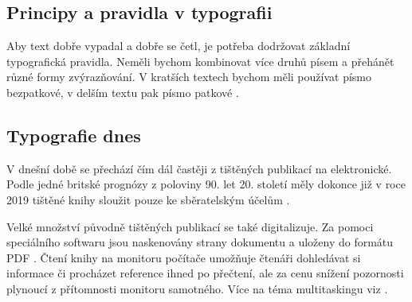 \documentclass[a4paper, 11pt]{article}
\begin{document}
\subsection{Principy a pravidla v typografii}
Aby text dobře vypadal a dobře se četl, je potřeba dodržovat základní typografická pravidla. Neměli bychom kombinovat více druhů písem a přehánět různé formy zvýrazňování. V kratších textech bychom měli používat písmo bezpatkové, v delším textu pak písmo patkové \cite{Tejkalova2014}.

\subsection{Typografie dnes}
V dnešní době se přechází čím dál častěji z tištěných publikací na elektronické. Podle jedné britské prognózy z poloviny 90. let 20. století měly dokonce již v roce 2019 tištěné knihy sloužit pouze ke sběratelským účelům \cite{Cisar2006}. 

Velké množství původně tištěných publikací se také digitalizuje. Za pomoci speciálního softwaru jsou naskenovány strany dokumentu a uloženy do formátu PDF \cite{Stern2009}.
Čtení knihy na monitoru počítače umožňuje čtenáři dohledávat si informace či procházet reference ihned po přečtení, ale za cenu snížení pozornosti plynoucí z přítomnosti monitoru samotného. Více na téma multitaskingu viz \cite{Gomolski2006}.




\newpage

\renewcommand{\refname}{Literatura}

\end{document}
